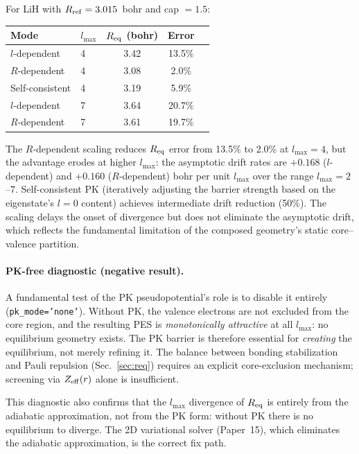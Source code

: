 \documentclass[aps,pra,twocolumn,superscriptaddress,longbibliography,floatfix]{revtex4-2}
\begin{document}
For LiH with $R_{\rm ref} = 3.015$~bohr and cap $= 1.5$:

\begin{center}
\begin{tabular}{llccc}
\hline
Mode & $l_{\max}$ & $R_{\rm eq}$ (bohr) & Error \\
\hline
$l$-dependent     & 4 & 3.42 & 13.5\% \\
$R$-dependent     & 4 & 3.08 &  2.0\% \\
Self-consistent   & 4 & 3.19 &  5.9\% \\
$l$-dependent     & 7 & 3.64 & 20.7\% \\
$R$-dependent     & 7 & 3.61 & 19.7\% \\
\hline
\end{tabular}
\end{center}

\noindent
The $R$-dependent scaling reduces $R_{\rm eq}$ error from 13.5\% to
2.0\% at $l_{\max} = 4$, but the advantage erodes at higher
$l_{\max}$: the asymptotic drift rates are $+0.168$ ($l$-dependent)
and $+0.160$ ($R$-dependent) bohr per unit $l_{\max}$ over the
range $l_{\max} = 2$--$7$.  Self-consistent PK (iteratively
adjusting the barrier strength based on the eigenstate's $l = 0$
content) achieves intermediate drift reduction (50\%).  The scaling
delays the onset of divergence but does not eliminate the asymptotic
drift, which reflects the fundamental limitation of the composed
geometry's static core--valence partition.

\paragraph{PK-free diagnostic (negative result).}
A fundamental test of the PK pseudopotential's role is to disable it
entirely (\texttt{pk\_mode='none'}).  Without PK, the valence
electrons are not excluded from the core region, and the resulting
PES is \emph{monotonically attractive} at all $l_{\max}$: no
equilibrium geometry exists.  The PK barrier is therefore essential
for \emph{creating} the equilibrium, not merely refining it.  The
balance between bonding stabilization and Pauli repulsion
(Sec.~\ref{sec:req}) requires an explicit core-exclusion mechanism;
screening via $Z_{\rm eff}(r)$ alone is insufficient.

This diagnostic also confirms that the $l_{\max}$ divergence of
$R_{\rm eq}$ is entirely from the adiabatic approximation, not
from the PK form: without PK there is no equilibrium to diverge.
The 2D variational solver (Paper~15), which eliminates the adiabatic
approximation, is the correct fix path.
\end{document}
